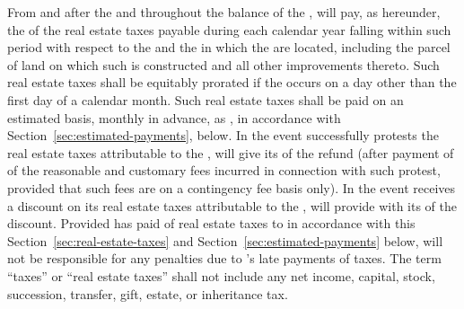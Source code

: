 \label{sec:real-estate-taxes}
From and after the \rentCommencementDate and throughout the balance of the \termOfLease, \lessee will pay, as \additionalRent hereunder, the \lesseesPercentage of the real estate taxes payable during each calendar year falling within such period with respect to the \commonAreas and the \building in which the \premises are located, including the parcel of land on which such \building is constructed and all other improvements thereto. Such real estate taxes shall be equitably prorated if the \rentCommencementDate occurs on a day other than the first day of a calendar month. Such real estate taxes shall be paid on an estimated basis, monthly in advance, as \additionalRent, in accordance with Section~\ref{sec:estimated-payments}, below. In the event \lessor successfully protests the real estate taxes attributable to the \building, \lessor will give \lessee its \lesseesPercentage of the refund (after payment of \lesseesPercentage of the reasonable and customary fees incurred in connection with such protest, provided that such fees are on a contingency fee basis only). In the event \lessor receives a discount on its real estate taxes attributable to the \building, \lessor will provide \lessee with its \lesseesPercentage of the discount. Provided \lessee has paid \lesseesPercentage of real estate taxes to \lessor in accordance with this Section~\ref{sec:real-estate-taxes} and Section~\ref{sec:estimated-payments} below, \lessee will not be responsible for any penalties due to \lessor's late payments of taxes. The term ``taxes'' or ``real estate taxes'' shall not include any net income, capital, stock, succession, transfer, gift, estate, or inheritance tax.
